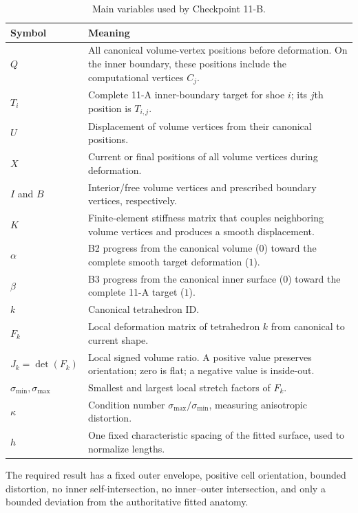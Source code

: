 \documentclass[11pt]{article}
\begin{document}
\begin{table}[H]
\centering
\small
\begin{tabularx}{\textwidth}{@{}p{}X@{}}
\toprule
\textbf{Symbol} & \textbf{Meaning}\\
\midrule
$Q$ & All canonical volume-vertex positions before deformation. On the inner boundary,
these positions include the computational vertices $C_j$.\\
$T_i$ & Complete 11-A inner-boundary target for shoe $i$; its $j$th position is $T_{i,j}$.\\
$U$ & Displacement of volume vertices from their canonical positions.\\
$X$ & Current or final positions of all volume vertices during deformation.\\
$I$ and $B$ & Interior/free volume vertices and prescribed boundary vertices,
respectively.\\
$K$ & Finite-element stiffness matrix that couples neighboring volume vertices and
produces a smooth displacement.\\
$\alpha$ & B2 progress from the canonical volume ($0$) toward the complete smooth target
deformation ($1$).\\
$\beta$ & B3 progress from the canonical inner surface ($0$) toward the complete 11-A
target ($1$).\\
$k$ & Canonical tetrahedron ID.\\
$F_k$ & Local deformation matrix of tetrahedron $k$ from canonical to current shape.\\
$J_k=\det(F_k)$ & Local signed volume ratio. A positive value preserves orientation;
zero is flat; a negative value is inside-out.\\
$\sigma_{\min},\sigma_{\max}$ & Smallest and largest local stretch factors of $F_k$.\\
$\kappa$ & Condition number $\sigma_{\max}/\sigma_{\min}$, measuring anisotropic
distortion.\\
$h$ & One fixed characteristic spacing of the fitted surface, used to normalize lengths.\\
\bottomrule
\end{tabularx}
\caption{Main variables used by Checkpoint 11-B.}
\label{tab:11b-notation}
\end{table}

The required result has a fixed outer envelope, positive cell orientation, bounded
distortion, no inner self-intersection, no inner--outer intersection, and only a bounded
deviation from the authoritative fitted anatomy.
\end{document}

